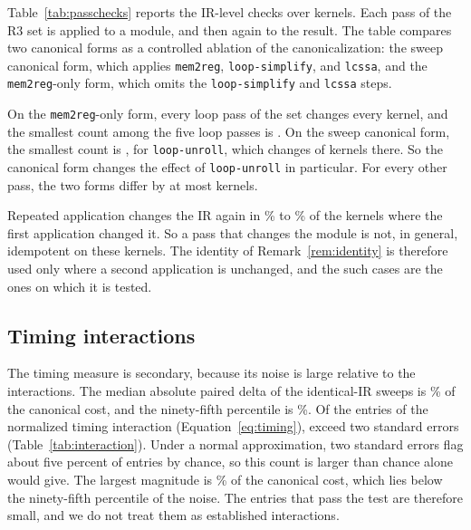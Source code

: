 Table~\ref{tab:passchecks} reports the IR-level checks over \PassChecksKernels{} kernels. Each pass of the R3 set is applied to a
module, and then again to the result. The table compares two canonical forms as a controlled ablation of the canonicalization: the sweep canonical form, which applies \texttt{mem2reg}, \texttt{loop-simplify}, and \texttt{lcssa}, and the \texttt{mem2reg}-only form, which omits the \texttt{loop-simplify} and \texttt{lcssa} steps.

On the \texttt{mem2reg}-only form, every loop pass of the set changes every kernel, and the smallest count among the five loop
passes is \PassChecksLoopMinMemTwoReg{}. On the sweep canonical form, the smallest count is \PassChecksLoopMinCanonical{}, for
\texttt{loop-unroll}, which changes \PassChecksUnrollCanonicalChanged{} of \PassChecksKernels{} kernels there. So the canonical
form changes the effect of \texttt{loop-unroll} in particular. For every other pass, the two forms differ by at most
\PassChecksOtherMaxDiff{} kernels.



Repeated application changes the IR again in \PassChecksRepeatMinPct{}\% to \PassChecksRepeatMaxPct{}\% of the kernels where the
first application changed it. So a pass that changes the module is not, in general, idempotent on these kernels. The identity of
Remark~\ref{rem:identity} is therefore used only where a second application is unchanged, and the \InstSelfIdentityCases{} such
cases are the ones on which it is tested.

\subsection{Timing interactions}
\label{sec:results-timing}

The timing measure is secondary, because its noise is large relative to the interactions. The median absolute paired delta of
the identical-IR sweeps is \NoiseMedianAbsPct{}\% of the canonical cost, and the ninety-fifth percentile is
\NoiseNinetyFifthAbsPct{}\%. Of the \InteractionCells{} entries of the normalized timing interaction (Equation~\ref{eq:timing}),
\InteractionSignificantCells{} exceed two standard errors (Table~\ref{tab:interaction}). Under a normal approximation, two
standard errors flag about five percent of entries by chance, so this count is larger than chance alone would give. The largest
magnitude is \InteractionMaxAbsPct{}\% of the canonical cost, which lies below the ninety-fifth percentile of the noise. The
entries that pass the test are therefore small, and we do not treat them as established interactions.

